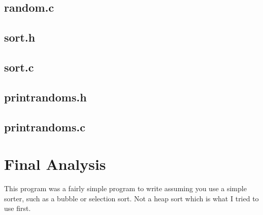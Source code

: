 \documentclass[letterpaper,oneside]{scrartcl}
\begin{document}
\subsection{random.c}

\subsection{sort.h}

\subsection{sort.c}

\subsection{printrandoms.h}

\subsection{printrandoms.c}

\section{Final Analysis}
This program was a fairly simple program to write assuming you use a simple
sorter, such as a bubble or selection sort. Not a heap sort which is what I
tried to use first.
\end{document}

